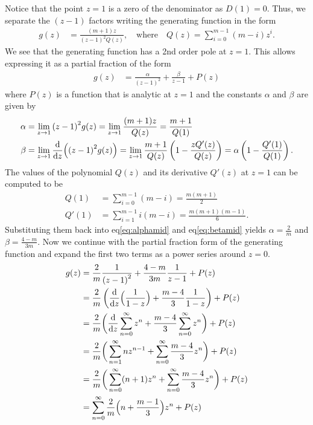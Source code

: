 Notice that the point $z=1$ is a zero of the denominator as $D(1) = 0$. Thus, we separate the $(z-1)$ factors writing the generating function in the form
\begin{align}
	g(z) &= \frac{(m+1)z}{{(z-1)}^2 Q(z)},
	\quad\mbox{where}\quad Q(z) = \sum_{i=0}^{m-1} (m-i) z^i.
\end{align}
We see that the generating function has a 2nd order pole at $z=1$. This allows expressing it as a partial fraction of the form
\begin{align}
	g(z) &= \frac{\alpha}{{(z-1)}^2} + \frac{\beta}{z-1} + P(z)
\end{align}
where $P(z)$ is a function that is analytic at $z=1$ and the constants $\alpha$ and $\beta$ are given by
\begin{align}
	\alpha
		&= \lim\limits_{z \rightarrow 1}{(z-1)}^2 g(z)
		 = \lim\limits_{z \rightarrow 1} \frac{(m+1)z}{Q(z)}
		 = \frac{m+1}{Q(1)}\label{eq:alphamid}\\
	\beta
		&= \lim\limits_{z \rightarrow 1}\frac{\mathrm{d}}{\mathrm{d} z}\Big({(z-1)}^2 g(z)\Big)
		 = \lim\limits_{z \rightarrow 1} \frac{m+1}{Q(z)}\left(1 - \frac{zQ'(z)}{Q(z)}\right)
		 = \alpha\left(1 - \frac{Q'(1)}{Q(1)}\right)\label{eq:betamid}.
\end{align}
The values of the polynomial $Q(z)$ and its derivative $Q'(z)$ at $z=1$ can be computed to be
\begin{align}
	Q(1)
		&= \sum_{i=0}^{m-1} (m-i)
		 = \frac{m(m+1)}{2}\\
	Q'(1)
		&= \sum_{i=1}^{m-1} i(m-i)
		 = \frac{m(m+1)(m-1)}{6}.
\end{align}
Substituting them back into eq\ref{eq:alphamid} and eq\ref{eq:betamid} yields $\alpha = \frac{2}{m}$ and $\beta = \frac{4-m}{3m}$. Now we continue with the partial fraction form of the generating function and expand the first two terms as a power series around $z=0$.
\begin{align}
	g(z)
		&= \frac{2}{m}\frac{1}{{(z-1)}^2} + \frac{4-m}{3m}\frac{1}{z-1} + P(z)\\
		&= \frac{2}{m}\left(\frac{\mathrm{d}}{\mathrm{d} z}\Big(\frac{1}{1-z}\Big) + \frac{m-4}{3}\frac{1}{1-z}\right) + P(z)\\
		&= \frac{2}{m}\bigg(\frac{\mathrm{d}}{\mathrm{d} z}\sum_{n=0}^\infty z^n + \frac{m-4}{3}\sum_{n=0}^\infty z^n\bigg) + P(z)\\
		&= \frac{2}{m}\bigg(\sum_{n=1}^\infty n z^{n-1} + \sum_{n=0}^\infty \frac{m-4}{3}z^n\bigg) + P(z)\\
		&= \frac{2}{m}\bigg(\sum_{n=0}^\infty (n+1) z^n + \sum_{n=0}^\infty \frac{m-4}{3}z^n\bigg) + P(z)\\
		&= \sum_{n=0}^\infty \frac{2}{m}\Big(n + \frac{m - 1}{3}\Big) z^n + P(z)\\
\end{align}

